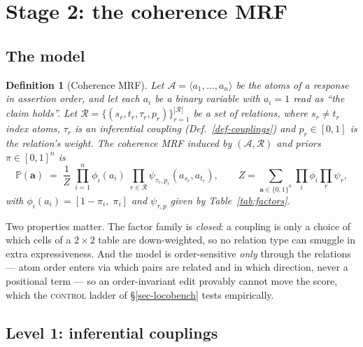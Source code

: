 \documentclass{article} %
\newtheorem{definition}{Definition}
\newcommand{\pr}[1]{\mathbb{P}\!\left( #1 \right)}
\begin{document}
\section{Stage 2: the coherence MRF}
\label{sec-coherence}

\subsection{The model}

\begin{definition}[Coherence MRF]
\label{def-mrf}
Let $\mathcal{A}=\langle a_1,\dots,a_n\rangle$ be the atoms of a response in assertion
order, and let each $a_i$ be a binary variable with $a_i=1$ read as ``the claim holds''.
Let $\mathcal{R}=\{(s_r,t_r,\tau_r,p_r)\}_{r=1}^{|\mathcal{R}|}$ be a set of
\emph{relations}, where $s_r\neq t_r$ index atoms, $\tau_r$ is an inferential coupling
(Def.~\ref{def-couplings}) and $p_r\in[0,1]$ is the relation's weight. The coherence MRF
induced by $(\mathcal{A},\mathcal{R})$ and priors $\pi\in[0,1]^n$ is
\begin{equation}
\pr{\mathbf{a}} \;=\; \frac{1}{Z}\;
  \prod_{i=1}^{n}\phi_i(a_i)\;
  \prod_{r\in\mathcal{R}}\psi_{\tau_r,p_r}\!\left(a_{s_r},a_{t_r}\right),
\qquad
Z=\sum_{\mathbf{a}\in\{0,1\}^n}\prod_i\phi_i\prod_r\psi_r ,
\label{eq-joint}
\end{equation}
with $\phi_i(a_i)=[1-\pi_i,\;\pi_i]$ and $\psi_{\tau,p}$ given by
Table~\ref{tab:factors}.
\end{definition}

Two properties matter. The factor family is \emph{closed}: a coupling is only a choice of which
cells of a $2\times2$ table are down-weighted, so no relation type can smuggle in extra
expressiveness. And the model is order-sensitive \emph{only} through the relations --- atom order
enters via which pairs are related and in which direction, never a positional term --- so an
order-invariant edit provably cannot move the score, which the \textsc{control} ladder of
\S\ref{sec-locobench} tests empirically.

\subsection{Level 1: inferential couplings}
\end{document}
